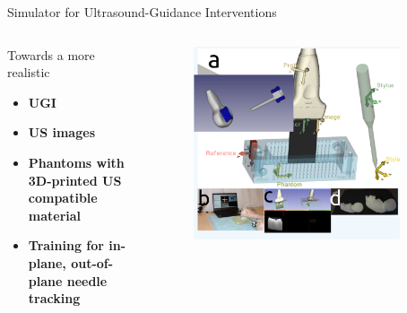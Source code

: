 {
\begin{frame}{Simulator for Ultrasound-Guidance Interventions}

  \begin{columns}
    \begin{column}{.3\linewidth}
      Towards a more realistic
  \begin{itemize}
    \item \textbf{UGI}
    \item \textbf{US images}
    \item \textbf{Phantoms with 3D-printed US compatible material}
    \item \textbf{Training for in-plane, out-of-plane needle tracking}
  \end{itemize}

    \end{column}


  \begin{column}{.6\linewidth}

      \begin{figure}
        \centering
        \includegraphics[width=0.9\textwidth]{./figures/simulator-for-ugi/versions/drawing-v02.png}
      \end{figure}

    \end{column}
  \end{columns}

\end{frame}
}